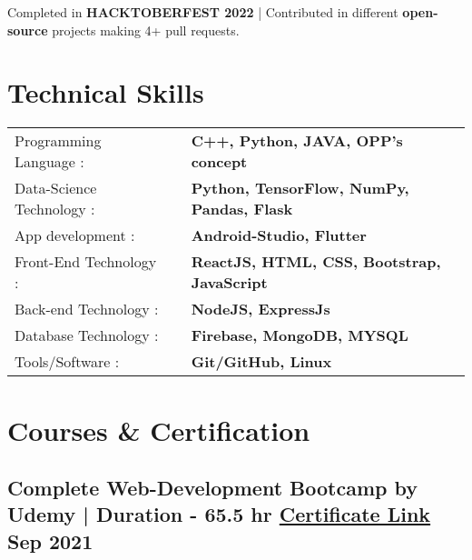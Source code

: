 \documentclass[a4,11pt]{article}
\begin{document}
     Completed in \textbf{HACKTOBERFEST 2022} | Contributed in different \textbf{open-source} projects making 4+ pull requests. 
    

    
\section{Technical Skills} 
\vspace{-0.1cm}
\begin{tabular}{p{15em} p{2em} p{43em}}
\normalsize{Programming Language :} && \textbf{C++, Python, JAVA, OPP’s concept}  \\
\normalsize{Data-Science Technology :} && \textbf{Python,  TensorFlow, NumPy, Pandas, Flask} \\ 
\normalsize{App development :} &&\textbf{Android-Studio, Flutter}  \\
\normalsize{Front-End Technology  :} && \textbf{ReactJS, HTML, CSS, Bootstrap, JavaScript} \\
\normalsize{Back-end Technology :} && \textbf{NodeJS, ExpressJs} \\   
\normalsize{Database Technology :} && \textbf{Firebase, MongoDB, MYSQL}  \\
\normalsize{Tools/Software :} && \textbf{Git/GitHub, Linux} \\
\end{tabular}
\vspace{-0.4cm}

\section{Courses \& Certification}
\vspace{0.0cm}
\subsection*{Complete Web-Development Bootcamp \normalfont by Udemy | Duration - 65.5 hr   
\href{https://udemy-certificate.s3.amazonaws.com/pdf/UC-600df134-c5cd-4eaf-b831-221894c39239.pdf}{Certificate Link} 
\hfill  Sep 2021}
\vspace{0.2cm}



\end{document}
